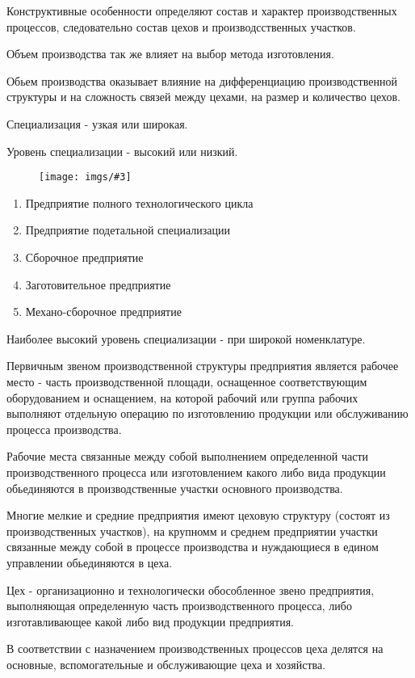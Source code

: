 \documentclass[14pt,a4paper,oneside]{extarticle}
\newcommand{\pic}[3]{
	\begin{figure}[#1]
		\begin{center}
			\texttt{[image: imgs/\#3]}
		\end{center}
	\end{figure}
}
\begin{document}
Конструктивные особенности определяют состав и характер производственных процессов, следовательно состав цехов и производсственных участков.

Объем производства так же влияет на выбор метода изготовления.

Обьем производства оказывает влияние на дифференциацию производственной структуры и на сложность связей между цехами, на размер и количество цехов.

Специализация - узкая или широкая.

Уровень специализации - высокий или низкий.

\pic{H}{\textwidth/2}{9}

\begin{enumerate}
    \item Предприятие полного технологического цикла 
    \item Предприятие подетальной специализации
    \item Сборочное предприятие
    \item Заготовительное предприятие 
    \item Механо-сборочное предприятие
\end{enumerate}

Наиболее высокий уровень специализации - при широкой номенклатуре.

Первичным звеном производственной структуры предприятия является рабочее место - часть производственной площади, оснащенное соответствующим оборудованием и оснащением, на которой рабочий или группа рабочих выполняют отдельную операцию по изготовлению продукции или обслуживанию процесса производства.

Рабочие места связанные между собой выполнением определенной части производственного процесса или изготовлением какого либо вида продукции обьединяются в производственные участки основного производства.

Многие мелкие и средние предприятия имеют цеховую структуру (состоят из производственных участков), на крупномм и среднем предприятии участки связанные между собой в процессе производства и нуждающиеся в едином управлении обьединяются в цеха.

Цех - организационно и технологически обособленное звено предприятия, выполняющая определенную часть производственного процесса, либо изготавливающее какой либо вид продукции предприятия.

В соответствии с назначением производственных процессов цеха делятся на основные, вспомогательные и обслуживающие цеха и хозяйства.
\end{document}
